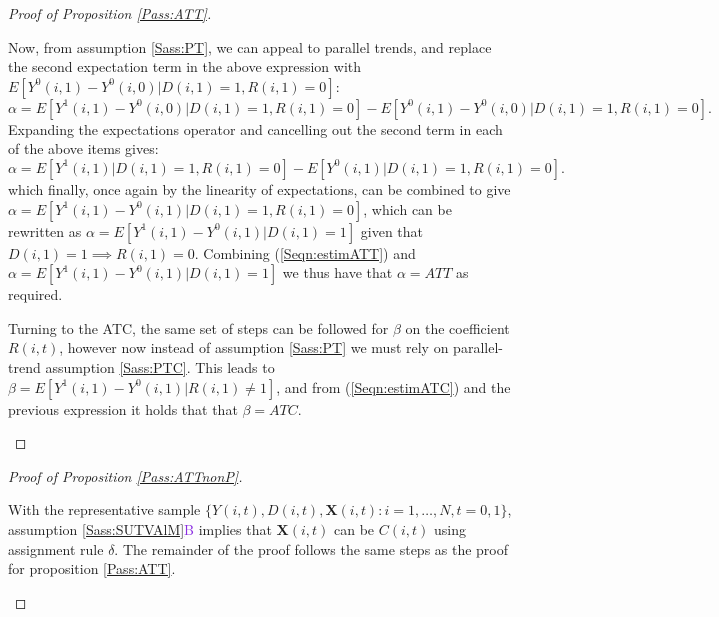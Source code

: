 \documentclass[12pt]{article}
\newcommand{\asref}[2]{\ref{#1}{\textcolor{BlueViolet}{#2}}}
\begin{document}
\begin{spacing}{1.3}
\begin{proof}[Proof of Proposition \ref{Pass:ATT}]
\begin{footnotesize}
Now, from assumption \ref{Sass:PT}, we can appeal to parallel trends, and 
replace the second expectation term in the above expression with $E
[Y^0(i,1)-Y^0(i,0)|D(i,1)=1,R(i,1)=0]$:
\begin{equation}
\nonumber
\label{Seqn:alphaProof4}
\alpha=E[Y^1(i,1)-Y^0(i,0)|D(i,1)=1,R(i,1)=0] - E[Y^0(i,1)-Y^0(i,0)|D(i,1)=1,R(i,1)=0].
\end{equation}
Expanding the expectations operator and cancelling out the second term in each of
the above items gives:
\begin{equation}
\nonumber
\label{Seqn:alphaProof5}
\alpha=E[Y^1(i,1)|D(i,1)=1,R(i,1)=0] - E[Y^0(i,1)|D(i,1)=1,R(i,1)=0].
\end{equation}
which finally, once again by the linearity of expectations, can be combined to 
give $\alpha=E[Y^1(i,1)-Y^0(i,1)|D(i,1)=1,R(i,1)=0]$, which can be 
rewritten as $\alpha=E[Y^1(i,1)-Y^0(i,1)|D(i,1)=1]$ given that 
$D(i,1)=1 \implies R(i,1)=0$.  Combining (\ref{Seqn:estimATT}) and $\alpha=
E[Y^1(i,1)-Y^0(i,1)|D(i,1)=1]$ we thus have that $\alpha=ATT$ as 
required.

Turning to the ATC, the same set of steps can be followed for $\beta$ on the 
coefficient $R(i,t)$, however now instead of assumption \ref{Sass:PT} we must
rely on parallel-trend assumption \ref{Sass:PTC}. This leads to $\beta=
E[Y^1(i,1)-Y^0(i,1)|R(i,1)\neq 1]$, and from (\ref{Seqn:estimATC}) 
and the previous expression it holds that that $\beta=ATC$.
\end{footnotesize}
\end{proof}

\begin{proof}[Proof of Proposition \ref{Pass:ATTnonP}]
\begin{footnotesize}
With the representative sample $\{Y(i,t), D(i,t), \mathbf{X}(i,t): i=1, \ldots, N, 
t=0, 1\}$, assumption \asref{Sass:SUTVAlM}{B} implies that $\mathbf{X}(i,t)$ can
be $C(i,t)$ using assignment rule $\delta$.  The remainder of the proof follows
the same steps as the proof for proposition \ref{Pass:ATT}.
\end{footnotesize}
\end{proof}

\clearpage


\end{spacing}
\end{document}
